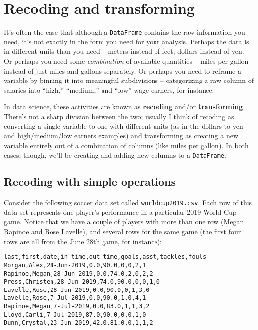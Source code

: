 
\chapter{Recoding and transforming}

It's often the case that although a \texttt{DataFrame} contains the raw
information you need, it's not exactly in the form you need for your analysis.
Perhaps the data is in different units than you need -- meters instead of feet;
dollars instead of yen. Or perhaps you need some \textit{combination} of
available quantities -- miles per gallon instead of just miles and gallons
separately. Or perhaps you need to reframe a variable by binning it into
meaningful subdivisions -- categorizing a raw column of salaries into ``high,''
``medium,'' and ``low'' wage earners, for instance.

In data science, these activities are known as \textbf{recoding} and/or
\textbf{transforming}. There's not a sharp division between the two; usually I
think of recoding as converting a single variable to one with different units
(as in the dollars-to-yen and high/medium/low earners examples) and
transforming as creating a new variable entirely out of a combination of
columns (like miles per gallon). In both cases, though, we'll be creating and
adding new columns to a \texttt{DataFrame}.

\section{Recoding with simple operations}


Consider the following soccer data set called \texttt{worldcup2019.csv}.
Each row of this data set represents one player's performance in a particular
2019 World Cup game. Notice that we have a couple of players with more than one
row (Megan Rapinoe and Rose Lavelle), and several rows for the same game (the
first four rows are all from the June 28th game, for instance):

\pagebreak
\begin{Verbatim}[fontsize=\small,samepage=true,frame=lines,framesep=3mm]
last,first,date,in_time,out_time,goals,asst,tackles,fouls
Morgan,Alex,28-Jun-2019,0.0,90.0,0,0,2,1
Rapinoe,Megan,28-Jun-2019,0.0,74.0,2,0,2,2
Press,Christen,28-Jun-2019,74.0,90.0,0,0,1,0
Lavelle,Rose,28-Jun-2019,0.0,90.0,0,1,3,0
Lavelle,Rose,7-Jul-2019,0.0,90.0,1,0,4,1
Rapinoe,Megan,7-Jul-2019,0.0,83.0,1,1,3,2
Lloyd,Carli,7-Jul-2019,87.0,90.0,0,0,1,0
Dunn,Crystal,23-Jun-2019,42.0,81.0,0,1,1,2
\end{Verbatim}

